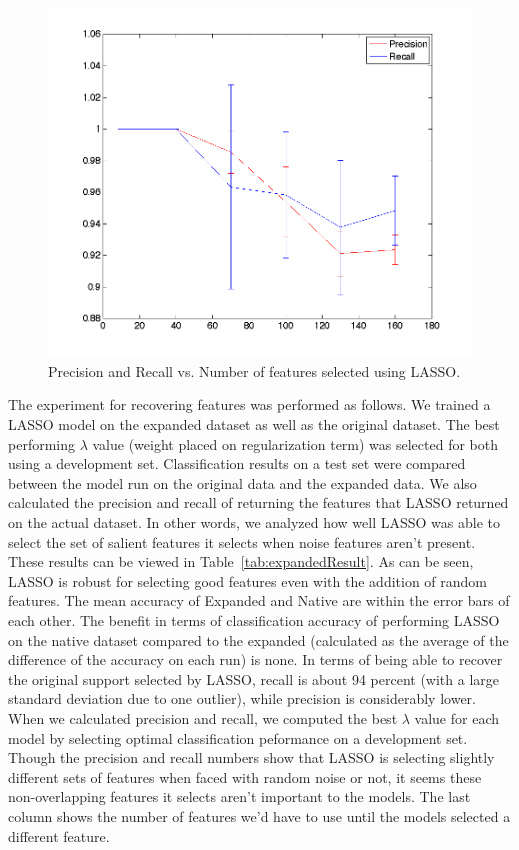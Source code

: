 \begin{center}
\begin{figure}[!ht]
\centering
\includegraphics[width=.7\textwidth]{../images/precisionrecallExpansion.png}
\caption{Precision and Recall vs. Number of features selected using LASSO.}
\label{fig:precrecall}
\end{figure}
\end{center}

The experiment for recovering features was performed as follows. We trained a LASSO model on the expanded dataset as well as the original dataset. The best performing $\lambda$ value (weight placed on regularization term) was selected for both using a development set. Classification results on a test set were compared between the model run on the original data and the expanded data. We also calculated the precision and recall of returning the features that LASSO returned on the actual dataset. In other words, we analyzed how well LASSO was able to select the set of salient features it selects when noise features aren't present.  These results can be viewed in Table~\ref{tab:expandedResult}. As can be seen, LASSO is robust for selecting good features even with the addition of random features. The mean accuracy of Expanded and Native are within the error bars of each other. The benefit in terms of classification accuracy of performing LASSO on the native dataset compared to the expanded (calculated as the average of the difference of the accuracy on each run) is none. In terms of being able to recover the original support selected by LASSO, recall is about 94 percent (with a large standard deviation due to one outlier), while precision is considerably lower. When we calculated precision and recall, we computed the best $\lambda$ value for each model by selecting optimal classification peformance on a development set. Though the precision and recall numbers show that LASSO is selecting slightly different sets of features when faced with random noise or not, it seems these non-overlapping features it selects aren't important to the models. The last column shows the number of features we'd have to use until the models selected a different feature. 

